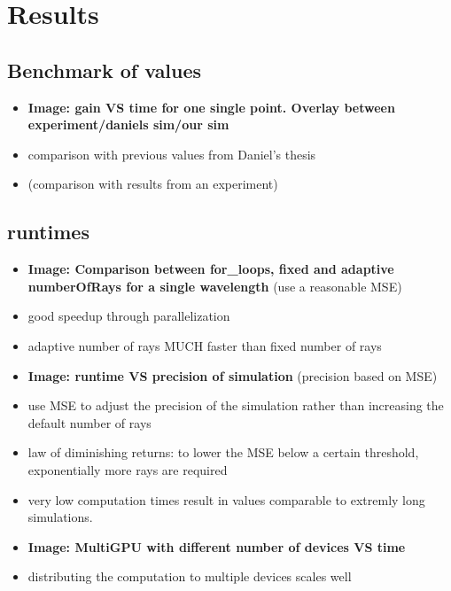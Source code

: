 \section{Results}

\subsection{Benchmark of values}

\begin{itemize}

  \item \textbf{Image: gain VS time for one single point. Overlay between
    experiment/daniels sim/our sim}

  \item comparison with previous values from Daniel's thesis

  \item (comparison with results from an experiment)

\end{itemize}



\subsection{runtimes}

\begin{itemize}

  \item \textbf{Image: Comparison between for\_loops, fixed and adaptive
    numberOfRays for a single wavelength} (use a reasonable MSE)

  \item good speedup through parallelization

  \item adaptive number of rays MUCH faster than fixed number of rays

  \item \textbf{Image: runtime VS precision of simulation} (precision based on
    MSE)

  \item use MSE to adjust the precision of the simulation rather than
    increasing the default number of rays

  \item law of diminishing returns: to lower the MSE below a certain threshold,
    exponentially more rays are required

  \item very low computation times result in values comparable to extremly long
    simulations.

  \item \textbf{Image: MultiGPU with different number of devices VS time}

  \item distributing the computation to multiple devices scales well

\end{itemize}
